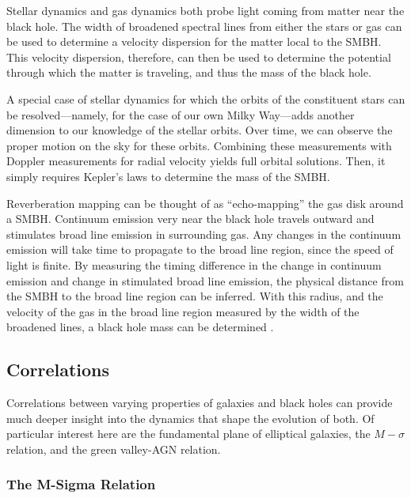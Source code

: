 Stellar dynamics and gas dynamics both probe light coming from matter near the black hole.  The width of broadened spectral lines from either the stars or gas can be used to determine a velocity dispersion for the matter local to the SMBH.  This velocity dispersion, therefore, can then be used to determine the potential through which the matter is traveling, and thus the mass of the black hole.

A special case of stellar dynamics for which the orbits of the constituent stars can be resolved---namely, for the case of our own Milky Way---adds another dimension to our knowledge of the stellar orbits.  Over time, we can observe the proper motion on the sky for these orbits.  Combining these measurements with Doppler measurements for radial velocity yields full orbital solutions.  Then, it simply requires Kepler's laws to determine the mass of the SMBH.

Reverberation mapping can be thought of as ``echo-mapping'' the gas disk around a SMBH.  Continuum emission very near the black hole travels outward and stimulates broad line emission in surrounding gas.  Any changes in the continuum emission will take time to propagate to the broad line region, since the speed of light is finite.  By measuring the timing difference in the change in continuum emission and change in stimulated broad line emission, the physical distance from the SMBH to the broad line region can be inferred.  With this radius, and the velocity of the gas in the broad line region measured by the width of the broadened lines, a black hole mass can be determined \citep{blandford_1982}.



\subsection{Correlations}

Correlations between varying properties of galaxies and black holes can provide much deeper insight into the dynamics that shape the evolution of both.  Of particular interest here are the fundamental plane of elliptical galaxies, the $M-\sigma$ relation, and the green valley-AGN relation.


\subsubsection{The M-Sigma Relation}


